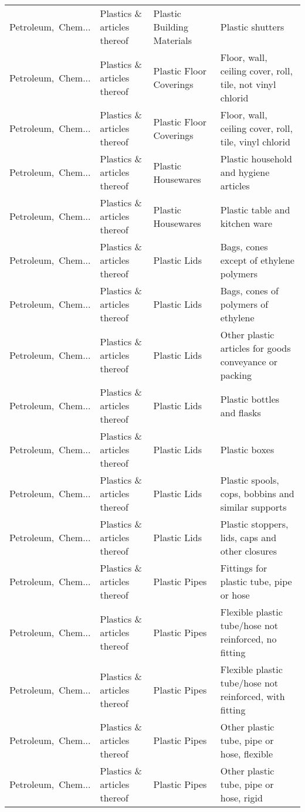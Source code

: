 \begin{appendices}
\begin{xltabular}{\textwidth}{|p{0.10\textwidth}|p{0.25\textwidth}|p{0.24\textwidth}|p{0.31\textwidth}|}
Petroleum,\ Chem... & Plastics \& articles thereof & Plastic Building Materials & Plastic shutters \\
Petroleum,\ Chem... & Plastics \& articles thereof & Plastic Floor Coverings & Floor, wall, ceiling cover, roll, tile, not vinyl chlorid \\
Petroleum,\ Chem... & Plastics \& articles thereof & Plastic Floor Coverings & Floor, wall, ceiling cover, roll, tile, vinyl chlorid \\
Petroleum,\ Chem... & Plastics \& articles thereof & Plastic Housewares & Plastic household and hygiene articles  \\
Petroleum,\ Chem... & Plastics \& articles thereof & Plastic Housewares & Plastic table and kitchen ware \\
Petroleum,\ Chem... & Plastics \& articles thereof & Plastic Lids & Bags, cones except of ethylene polymers \\
Petroleum,\ Chem... & Plastics \& articles thereof & Plastic Lids & Bags, cones of polymers of ethylene \\
Petroleum,\ Chem... & Plastics \& articles thereof & Plastic Lids & Other plastic articles for goods conveyance or packing \\
Petroleum,\ Chem... & Plastics \& articles thereof & Plastic Lids & Plastic bottles and flasks \\
Petroleum,\ Chem... & Plastics \& articles thereof & Plastic Lids & Plastic boxes \\
Petroleum,\ Chem... & Plastics \& articles thereof & Plastic Lids & Plastic spools, cops, bobbins and similar supports \\
Petroleum,\ Chem... & Plastics \& articles thereof & Plastic Lids & Plastic stoppers, lids, caps and other closures \\
Petroleum,\ Chem... & Plastics \& articles thereof & Plastic Pipes & Fittings for plastic tube, pipe or hose \\
Petroleum,\ Chem... & Plastics \& articles thereof & Plastic Pipes & Flexible plastic tube/hose not reinforced, no fitting \\
Petroleum,\ Chem... & Plastics \& articles thereof & Plastic Pipes & Flexible plastic tube/hose not reinforced, with fitting \\
Petroleum,\ Chem... & Plastics \& articles thereof & Plastic Pipes & Other plastic tube, pipe or hose, flexible \\
Petroleum,\ Chem... & Plastics \& articles thereof & Plastic Pipes & Other plastic tube, pipe or hose, rigid \\

\end{xltabular}
\end{appendices}
